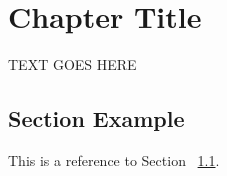 \chapter{Chapter Title}
\label{chapter_label}

TEXT GOES HERE

\section{Section Example}
\label{section_example}

This is a reference to Section ~\ref{section_example}.
